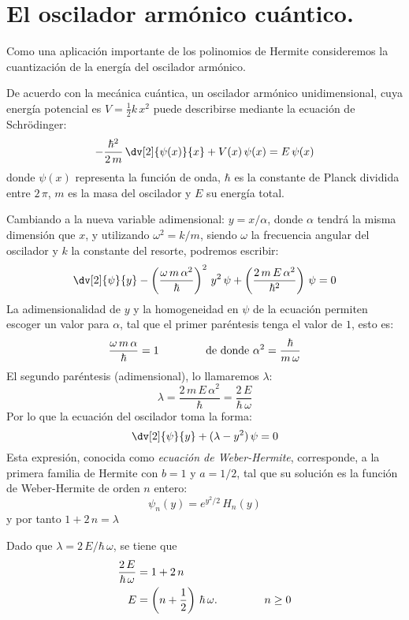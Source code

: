 \section{El oscilador armónico cuántico.}
Como una aplicación importante de los polinomios de Hermite consideremos la cuantización de la energía del oscilador armónico.
\par
De acuerdo con la mecánica cuántica, un oscilador armónico unidimensional, cuya energía potencial es $V = \frac{1}{2} k \, x^{2}$ puede describirse mediante la ecuación de Schrödinger:
\[ - \dfrac{\hbar^{2}}{2 \, m} \, \dv[2]{\psi (x)}{x} + V (x) \, \psi (x) =  E \, \psi (x) \]
donde $\psi (x)$ representa la función de onda, $\hbar$ es la constante de Planck dividida entre $2 \, \pi$, $m$ es la masa del oscilador y $E$ su energía total. 
\par
Cambiando a la nueva variable adimensional: $y = x/\alpha$, donde $\alpha$ tendrá la misma dimensión que $x$, y utilizando $\omega^{2} = k/m$, siendo $\omega$ la frecuencia angular del oscilador y $k$ la constante del resorte, podremos escribir:
\[ \dv[2]{\psi}{y} - \left( \dfrac{\omega \, m \, \alpha^{2}}{\hbar}  \right)^{2} \, y^{2} \, \psi  + \left( \dfrac{2 \, m \, E \, \alpha^{2}}{\hbar^{2}} \right) \, \psi = 0 \] 
La adimensionalidad de $y$ y la homogeneidad en $\psi$ de la ecuación permiten escoger un valor para $\alpha$, tal que el primer paréntesis tenga el valor de $1$, esto es:
\[ \dfrac{\omega \, m \, \alpha}{\hbar} = 1 \hspace{1.5cm} \mbox{de donde } \alpha^{2} = \dfrac{\hbar}{m \, \omega} \]
El segundo paréntesis (adimensional), lo llamaremos $\lambda$:
\[ \lambda = \dfrac{2 \, m \, E \, \alpha^{2}}{\hbar} = \dfrac{2 \, E}{\hbar \, \omega} \]
Por lo que la ecuación del oscilador toma la forma:
\begin{equation}
\dv[2]{\psi}{y} + (\lambda - y^{2}) \, \psi = 0
\label{eq:ecuacion_08_66}
\end{equation}
Esta expresión, conocida como \emph{ecuación de Weber-Hermite}, corresponde, a la primera familia de Hermite con $b = 1$ y $a = 1/2$, tal que su solución es la función de Weber-Hermite de orden $n$ entero:
\begin{equation}
\psi_{n} (y) = e^{y^{2}/2} \, H_{n} (y)
\label{eq:ecuacion_08_67}
\end{equation}
y por tanto $1 + 2 \, n = \lambda$
\par
Dado que $\lambda = 2 \, E / \hbar \, \omega$, se tiene que
\begin{align}
\dfrac{2 \, E}{\hbar \, \omega} &= 1 + 2 \, n \nonumber \\
E &= \left(n + \dfrac{1}{2} \right) \, \hbar \, \omega. \hspace{1.5cm} n \geq 0
\label{eq:ecuacion_08_68}
\end{align}
